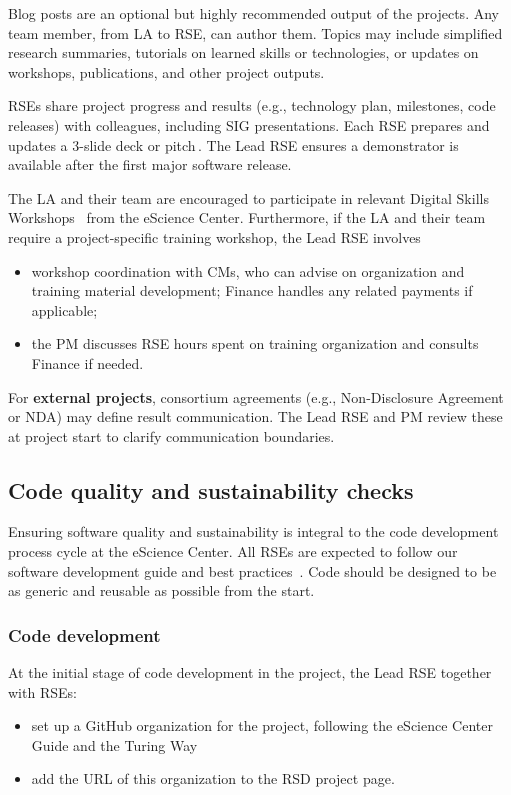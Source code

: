 Blog posts are an optional but highly recommended output of the projects. Any team member, from LA to RSE, can author them. 
Topics may include simplified research summaries, tutorials on learned skills or technologies, or updates on workshops, publications, and other project outputs.

RSEs share project progress and results (e.g., technology plan, milestones, code releases) with colleagues, 
including SIG presentations. Each RSE prepares and updates a 3-slide deck or pitch \cite{proj-portfolio}. 
The Lead RSE ensures a demonstrator is available after the first major software release.


The LA and their team are encouraged to participate in relevant Digital Skills Workshops~\cite{digital-skills} from the eScience Center. Furthermore, if the LA and their team
require a project-specific training workshop, the Lead RSE involves
\begin{itemize}
\item workshop coordination with CMs, who can advise on organization and training material development; Finance handles any related payments if applicable;
\item the PM discusses RSE hours spent on training organization and consults Finance if needed.
\end{itemize}

For \textbf{external projects}, consortium agreements (e.g., Non-Disclosure Agreement or NDA) may define result communication. The Lead RSE and PM review these at project start to clarify communication boundaries.

\subsection{Code quality and sustainability checks}
Ensuring software quality and sustainability is integral to the code development process cycle at the eScience
Center. All RSEs are expected to follow our software development guide and best practices~\cite{guide-nlesc}. Code should be 
designed to be as generic and reusable as possible from the start.

\subsubsection{Code development}
\label{sec:exec:code}
At the initial stage of code development in the project, the Lead RSE together with RSEs:

\begin{itemize}\itemsep0em
\item set up a GitHub organization for the project, following the eScience Center Guide and the Turing Way~\cite{the_turing_way-2023}
\item add the URL of this organization to the RSD project page.
\end{itemize}

